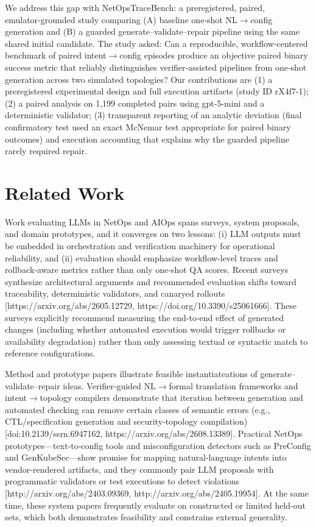 \documentclass[conference]{IEEEtran}
\begin{document}
We address this gap with NetOpsTraceBench: a preregistered, paired, emulator‑grounded study comparing (A) baseline one‑shot NL\ensuremath{\rightarrow}config generation and (B) a guarded generate--validate--repair pipeline using the same shared initial candidate. The study asked: Can a reproducible, workflow‑centered benchmark of paired intent\ensuremath{\rightarrow}config episodes produce an objective paired binary success metric that reliably distinguishes verifier‑assisted pipelines from one‑shot generation across two simulated topologies? Our contributions are (1) a preregistered experimental design and full execution artifacts (study ID rX4f7-1); (2) a paired analysis on 1,199 completed pairs using gpt-5-mini and a deterministic validator; (3) transparent reporting of an analytic deviation (final confirmatory test used an exact McNemar test appropriate for paired binary outcomes) and execution accounting that explains why the guarded pipeline rarely required repair.

\section{Related Work}
Work evaluating LLMs in NetOps and AIOps spans surveys, system proposals, and domain prototypes, and it converges on two lessons: (i) LLM outputs must be embedded in orchestration and verification machinery for operational reliability, and (ii) evaluation should emphasize workflow‑level traces and rollback‑aware metrics rather than only one‑shot QA scores. Recent surveys synthesize architectural arguments and recommended evaluation shifts toward traceability, deterministic validators, and canaryed rollouts [https://arxiv.org/abs/2605.12729, https://doi.org/10.3390/s25061666]. These surveys explicitly recommend measuring the end‑to‑end effect of generated changes (including whether automated execution would trigger rollbacks or availability degradation) rather than only assessing textual or syntactic match to reference configurations.

Method and prototype papers illustrate feasible instantiateations of generate--validate--repair ideas. Verifier‑guided NL\ensuremath{\rightarrow}formal translation frameworks and intent\ensuremath{\rightarrow}topology compilers demonstrate that iteration between generation and automated checking can remove certain classes of semantic errors (e.g., CTL/specification generation and security‑topology compilation) [doi:10.2139/ssrn.6947162, https://arxiv.org/abs/2608.13389]. Practical NetOps prototypes---text‑to‑config tools and misconfiguration detectors such as PreConfig and GenKubeSec---show promise for mapping natural‑language intents into vendor‑rendered artifacts, and they commonly pair LLM proposals with programmatic validators or test executions to detect violations [http://arxiv.org/abs/2403.09369, http://arxiv.org/abs/2405.19954]. At the same time, these system papers frequently evaluate on constructed or limited held‑out sets, which both demonstrates feasibility and constrains external generality.
\end{document}
